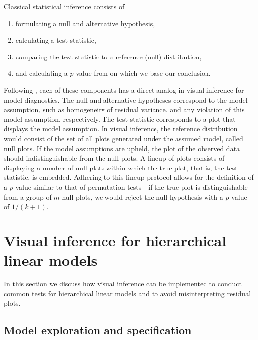 \documentclass{article} %
\begin{document}
Classical statistical inference consists of 
\begin{enumerate}
	\item formulating a null and alternative hypothesis,
	\item calculating a test statistic,
	\item comparing the test statistic to a reference (null) distribution,
	\item and calculating a $p$-value from on which we base our conclusion.
\end{enumerate}
Following \citeauthor{Buja:2009hp}, each of these components has a direct analog in visual inference for model diagnostics. The null and alternative hypotheses correspond to the model assumption, such as homogeneity of residual variance, and any violation of this model assumption, respectively. The test statistic corresponds to a plot that displays the model assumption. In visual inference, the reference distribution would consist of the set of all plots generated under the assumed model, called null plots. If the model assumptions are upheld, the plot of the observed data should indistinguishable from the null plots. A lineup of plots consists of displaying a number of null plots within which the true plot, that is, the test statistic, is embedded. Adhering to this lineup protocol allows for the definition of a $p$-value similar to that of permutation tests---if the true plot is distinguishable from a group of $m$ null plots, we would reject the null hypothesis with a $p$-value of $1 / (k + 1)$.

\section{Visual inference for hierarchical linear models}

In this section we discuss how visual inference can be implemented to conduct common tests for hierarchical linear models and to avoid misinterpreting residual plots.

\subsection{Model exploration and specification}
\end{document}
